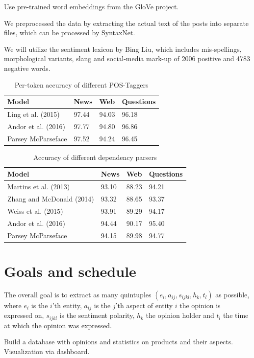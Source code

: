 \documentclass[10pt,a4paper]{article}
\begin{document}
	Use pre-trained word embeddings from the GloVe project.
	
	We preprocessed the data by extracting the actual text of the posts into separate files, which can be processed by SyntaxNet.
	
	We will utilize the sentiment lexicon by Bing Liu, which includes mis-spellings, morphological variants, slang and social-media mark-up of 2006 positive and 4783 negative words.
	
	\begin{table}[h]
		\centering
		\caption{Per-token accuracy of different POS-Taggers}
		\label{tab:posaccuracy}
		\begin{tabular}{|l|l|l|l|}
			\hline
			Model & News & Web & Questions \\
			\hline
			Ling et al. (2015) & 97.44 & 94.03 & 96.18 \\
			\hline
			Andor et al. (2016) & 97.77 & 94.80 & 96.86 \\
			\hline
			Parsey McParseface & 97.52 & 94.24 & 96.45 \\
			\hline
		\end{tabular}
	\end{table}
	
	\begin{table}[h]
		\centering
		\caption{Accuracy of different dependency parsers}
		\label{tab:parseraccuracy}
		\begin{tabular}{|l|l|l|l|}
			\hline
			Model & News & Web & Questions \\
			\hline
			Martins et al. (2013) & 93.10 & 88.23 & 94.21 \\
			\hline
			Zhang and McDonald (2014) & 93.32 & 88.65 & 93.37 \\
			\hline
			Weiss et al. (2015) & 93.91 & 89.29 & 94.17 \\
			\hline
			Andor et al. (2016) & 94.44 & 90.17 & 95.40 \\
			\hline
			Parsey McParseface & 94.15 & 89.98 & 94.77 \\
			\hline
		\end{tabular}
	\end{table}

	\section{Goals and schedule}
	The overall goal is to extract as many quintuples $(e_i, a_{ij}, s_{ijkl}, h_k, t_l)$ as possible, where $e_i$ is the $i$'th entity, $a_{ij}$ is the $j$'th aspect of entity $i$ the opinion is expressed on, $s_{ijkl}$ is the sentiment polarity, $h_k$ the opinion holder and $t_l$ the time at which the opinion was expressed.
	
	Build a database with opinions and statistics on products and their aspects.
	Visualization via dashboard.

	\newpage

	\nocite{DBLP:journals/corr/AndorAWSPGPC16}
	\nocite{Liu12sentimentanalysis}
	\nocite{Zhang2014}
	\nocite{pennington2014glove}
	\nocite{syntaxnet}
	\nocite{Ding:2008:HLA:1341531.1341561}
	\nocite{Hu:2004:MSC:1014052.1014073}

	
	
\end{document}
